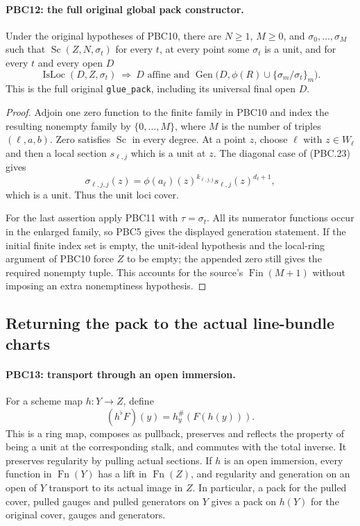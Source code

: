 \documentclass[11pt,a4paper]{article}
\numberwithin{equation}{section}
\theoremstyle{remark}\newtheorem{remark}[theorem]{Remark}
\begin{document}
\paragraph{PBC12: the full original global pack constructor.}
\label{claim:PBC12}
Under the original hypotheses of PBC10, there are $N\ge1$,
$M\ge0$, and $\sigma_0,\ldots,\sigma_M$ such that
$\operatorname{Sc}(Z,N,\sigma_t)$ for every $t$, at every point
some $\sigma_t$ is a unit, and for every $t$ and every open $D$
\[
 \operatorname{IsLoc}(D,Z,\sigma_t)
 \ \Longrightarrow\
 D\text{ affine and }
 \operatorname{Gen}\bigl(D,\phi(R)\cup\{\sigma_m/\sigma_t\}_m\bigr).
                                                        \tag{PBC.26}
\]
This is the full original \texttt{glue\_\allowbreak pack}, including its
universal final open $D$.

\begin{proof}
Adjoin one zero function to the finite family in PBC10 and index
the resulting nonempty family by
$\{0,\ldots,M\}$, where $M$ is the number of triples
$(\ell,a,b)$.  Zero satisfies $\operatorname{Sc}$ in every degree.
At a point $z$, choose $\ell$ with $z\in W_\ell$ and then a local
section $s_{\ell,j}$ which is a unit at $z$.  The diagonal case
of (PBC.23) gives
\[
 \sigma_{\ell,j,j}(z)
   =\phi(a_\ell)(z)^{k_{\ell,j,j}}
                     s_{\ell,j}(z)^{d_\ell+1},
\]
which is a unit.  Thus the unit loci cover.

For the last assertion apply PBC11 with $\tau=\sigma_t$.
All its numerator functions occur in the enlarged family,
so PBC5 gives the displayed generation statement.
If the initial finite index set is empty, the unit-ideal
hypothesis and the local-ring argument of PBC10 force $Z$ to be
empty; the appended zero still gives the required nonempty tuple.
This accounts for the source's $\operatorname{Fin}(M+1)$
without imposing an extra nonemptiness hypothesis.
\end{proof}

\subsection{Returning the pack to the actual line-bundle charts}

\paragraph{PBC13: transport through an open immersion.}
\label{claim:PBC13}
For a scheme map $h:Y\to Z$, define
\[
 (h^\flat F)(y)=h_y^\#(F(h(y))).
                                                        \tag{PBC.27}
\]
This is a ring map, composes as pullback, preserves and reflects
the property of being a unit at the corresponding stalk, and
commutes with the total inverse.  It preserves regularity by
pulling actual sections.  If $h$ is an open immersion, every
function in $\operatorname{Fn}(Y)$ has a lift in
$\operatorname{Fn}(Z)$, and regularity and generation on an open
of $Y$ transport to its actual image in $Z$.
In particular, a pack for the pulled cover, pulled gauges and
pulled generators on $Y$ gives a pack on $h(Y)$ for the original
cover, gauges and generators.
\end{document}

